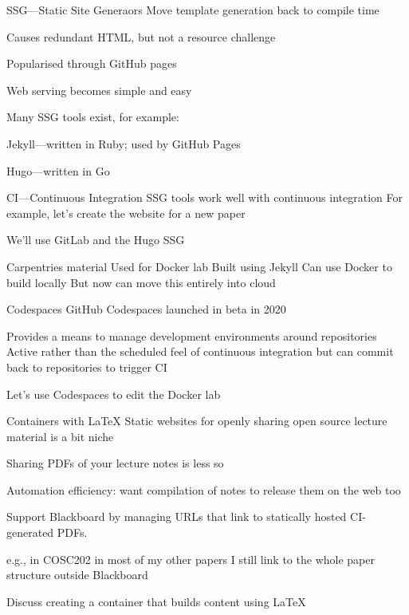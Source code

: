 \documentclass[aspectratio=169,t]{beamer}
\begin{document}
\begin{dframe}{SSG---Static Site Generaors}
  \1 Move template generation back to compile time

  \2 Causes redundant HTML, but not a resource challenge

  \1 Popularised through GitHub pages

  \2 Web serving becomes simple and easy

  \1 Many SSG tools exist, for example:

  \2 Jekyll---written in Ruby; used by GitHub Pages

  \2 Hugo---written in Go
\end{dframe}

\begin{dframe}{CI---Continuous Integration}
  \1 SSG tools work well with continuous integration
  \1 For example, let's create the website for a new paper
  
  \2 We'll use GitLab and the Hugo SSG
\end{dframe}

\begin{dframe}{Carpentries material}
  \1 Used for Docker lab 
  \1 Built using Jekyll
  \1 Can use Docker to build locally
  \1 But now can move this entirely into cloud
\end{dframe}

\begin{dframe}{Codespaces}
  \1 GitHub Codespaces launched in beta in 2020 %

  \2 Provides a means to manage development environments around repositories
  \2 Active rather than the scheduled feel of continuous integration
  \2 but can commit back to repositories to trigger CI

  \1 Let's use Codespaces to edit the Docker lab
\end{dframe}

\begin{dframe}{Containers with \LaTeX}
  \1 Static websites for openly sharing open source lecture material is a bit niche

  \1 Sharing PDFs of your lecture notes is less so
  
  \2 Automation efficiency: want compilation of notes to release them on the web too

  \1 Support Blackboard by managing URLs that link to statically hosted CI-generated PDFs.

  \2 e.g., in COSC202
  \2 in most of my other papers I still link to the whole paper structure outside Blackboard

  \1 Discuss creating a container that builds content using \LaTeX{}
\end{dframe}
\end{document}
